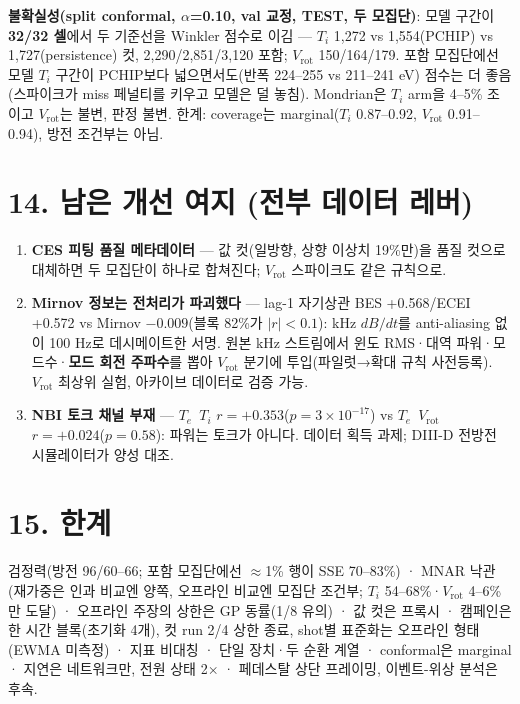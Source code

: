\documentclass[10pt,a4paper]{article}
\newcommand{\Ti}{\ensuremath{T_i}}
\newcommand{\Vrot}{\ensuremath{V_\mathrm{rot}}}
\begin{document}
\textbf{불확실성(split conformal, $\alpha$=0.10, val 교정, TEST, 두 모집단)}: 모델 구간이 \textbf{32/32 셀}에서 두 기준선을 Winkler 점수로 이김 — \Ti{} 1,272 vs 1,554(PCHIP) vs 1,727(persistence) 컷, 2,290/2,851/3,120 포함; \Vrot{} 150/164/179. 포함 모집단에선 모델 \Ti{} 구간이 PCHIP보다 넓으면서도(반폭 224–255 vs 211–241 eV) 점수는 더 좋음(스파이크가 miss 페널티를 키우고 모델은 덜 놓침). Mondrian은 \Ti{} arm을 4–5\% 조이고 \Vrot{}는 불변, 판정 불변. 한계: coverage는 marginal(\Ti{} 0.87–0.92, \Vrot{} 0.91–0.94), 방전 조건부는 아님.

\section*{14. 남은 개선 여지 (전부 데이터 레버)}
\begin{enumerate}
\item \textbf{CES 피팅 품질 메타데이터} — 값 컷(일방향, 상향 이상치 19\%만)을 품질 컷으로 대체하면 두 모집단이 하나로 합쳐진다; \Vrot{} 스파이크도 같은 규칙으로.
\item \textbf{Mirnov 정보는 전처리가 파괴했다} — lag-1 자기상관 BES +0.568/ECEI +0.572 vs Mirnov $-0.009$(블록 82\%가 $|r|<0.1$): kHz $dB/dt$를 anti-aliasing 없이 100 Hz로 데시메이트한 서명. 원본 kHz 스트림에서 윈도 RMS·대역 파워·모드수·\textbf{모드 회전 주파수}를 뽑아 \Vrot{} 분기에 투입(파일럿→확대 규칙 사전등록). \Vrot{} 최상위 실험, 아카이브 데이터로 검증 가능.
\item \textbf{NBI 토크 채널 부재} — $T_e$~\Ti{} $r=+0.353$($p=3\times10^{-17}$) vs $T_e$~\Vrot{} $r=+0.024$($p=0.58$): 파워는 토크가 아니다. 데이터 획득 과제; DIII-D 전방전 시뮬레이터가 양성 대조.
\end{enumerate}

\section*{15. 한계}
검정력(방전 96/60–66; 포함 모집단에선 $\approx$1\% 행이 SSE 70–83\%) · MNAR 낙관(재가중은 인과 비교엔 양쪽, 오프라인 비교엔 모집단 조건부; \Ti{} 54–68\%·\Vrot{} 4–6\%만 도달) · 오프라인 주장의 상한은 GP 동률(1/8 유의) · 값 컷은 프록시 · 캠페인은 한 시간 블록(초기화 4개), 컷 run 2/4 상한 종료, shot별 표준화는 오프라인 형태(EWMA 미측정) · 지표 비대칭 · 단일 장치·두 순환 계열 · conformal은 marginal · 지연은 네트워크만, 전원 상태 2$\times$ · 페데스탈 상단 프레이밍, 이벤트-위상 분석은 후속.
\end{document}
